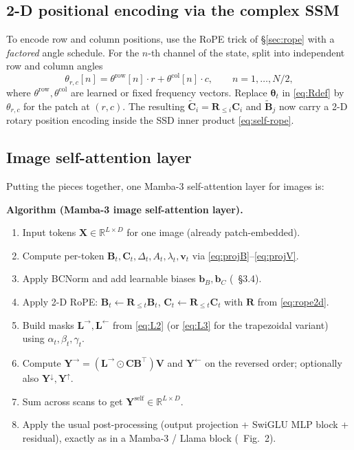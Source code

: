 \documentclass[11pt,a4paper]{article}
\begin{document}
\subsection{2-D positional encoding via the complex SSM}
\label{sec:rope2d}

To encode row and column positions, use the RoPE trick of
\S\ref{sec:rope} with a \emph{factored} angle schedule. For the
$n$-th channel of the state, split into independent row and column
angles
\begin{equation}\label{eq:rope2d}
  \theta_{r,c}[n] = \theta^{\text{row}}[n]\cdot r + \theta^{\text{col}}[n]\cdot c,
  \qquad n = 1,\dots,N/2,
\end{equation}
where $\theta^{\text{row}},\theta^{\text{col}}$ are learned or fixed
frequency vectors. Replace $\bm{\theta}_t$ in \eqref{eq:Rdef} by
$\theta_{r,c}$ for the patch at $(r,c)$. The resulting
$\widetilde{\bm{C}}_i = \bm{R}_{\le i}\bm{C}_i$ and
$\widetilde{\bm{B}}_j$ now carry a 2-D rotary position encoding
inside the SSD inner product \eqref{eq:self-rope}.

\subsection{Image self-attention layer}

Putting the pieces together, one Mamba-3 self-attention layer for
images is:

\medskip
\noindent\textbf{Algorithm (Mamba-3 image self-attention layer).}
\begin{enumerate}
  \item Input tokens $\bm{X}\in\mathbb{R}^{L\times D}$ for one image
        (already patch-embedded).
  \item Compute per-token $\bm{B}_t,\bm{C}_t,\Delta_t,A_t,\lambda_t,\bm{v}_t$
        via \eqref{eq:projB}–\eqref{eq:projV}.
  \item Apply BCNorm and add learnable biases $\bm{b}_B,\bm{b}_C$
        (\cite{mamba3}~\S 3.4).
  \item Apply 2-D RoPE: $\bm{B}_t\leftarrow \bm{R}_{\le t}\bm{B}_t$,
        $\bm{C}_t\leftarrow \bm{R}_{\le t}\bm{C}_t$
        with $\bm{R}$ from \eqref{eq:rope2d}.
  \item Build masks $\bm{L}^{\to},\bm{L}^{\leftarrow}$ from
        \eqref{eq:L2} (or \eqref{eq:L3} for the trapezoidal
        variant) using $\alpha_t,\beta_t,\gamma_t$.
  \item Compute $\bm{Y}^\to = (\bm{L}^\to\odot\bm{C}\bm{B}^\top)\bm{V}$
        and $\bm{Y}^\leftarrow$ on the reversed order; optionally
        also $\bm{Y}^\downarrow,\bm{Y}^\uparrow$.
  \item Sum across scans to get
        $\bm{Y}^{\text{self}}\in\mathbb{R}^{L\times D}$.
  \item Apply the usual post-processing (output projection +
        SwiGLU MLP block + residual), exactly as in a Mamba-3 /
        Llama block (\cite{mamba3}~Fig.~2).
\end{enumerate}
\end{document}
